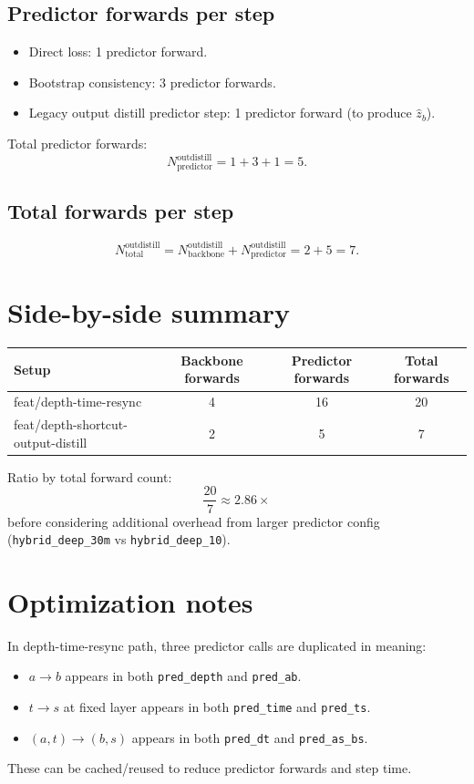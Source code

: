 \documentclass[11pt]{article}
\begin{document}
\subsection*{Predictor forwards per step}
\begin{itemize}[leftmargin=*]
  \item Direct loss: 1 predictor forward.
  \item Bootstrap consistency: 3 predictor forwards.
  \item Legacy output distill predictor step: 1 predictor forward (to produce \(\hat z_b\)).
\end{itemize}
Total predictor forwards:
\[
N_{\text{predictor}}^{\text{outdistill}} = 1 + 3 + 1 = 5.
\]

\subsection*{Total forwards per step}
\[
N_{\text{total}}^{\text{outdistill}} = N_{\text{backbone}}^{\text{outdistill}} + N_{\text{predictor}}^{\text{outdistill}} = 2 + 5 = 7.
\]

\section{Side-by-side summary}

\begin{center}
\begin{tabular}{lccc}
\toprule
Setup & Backbone forwards & Predictor forwards & Total forwards \\
\midrule
feat/depth-time-resync & 4 & 16 & 20 \\
feat/depth-shortcut-output-distill & 2 & 5 & 7 \\
\bottomrule
\end{tabular}
\end{center}

Ratio by total forward count:
\[
\frac{20}{7} \approx 2.86\times
\]
before considering additional overhead from larger predictor config
(\texttt{hybrid\_deep\_30m} vs \texttt{hybrid\_deep\_10}).

\section{Optimization notes}

In depth-time-resync path, three predictor calls are duplicated in meaning:
\begin{itemize}[leftmargin=*]
  \item \(a\!\to\!b\) appears in both \texttt{pred\_depth} and \texttt{pred\_ab}.
  \item \(t\!\to\!s\) at fixed layer appears in both \texttt{pred\_time} and \texttt{pred\_ts}.
  \item \((a,t)\!\to\!(b,s)\) appears in both \texttt{pred\_dt} and \texttt{pred\_as\_bs}.
\end{itemize}

These can be cached/reused to reduce predictor forwards and step time.
\end{document}
